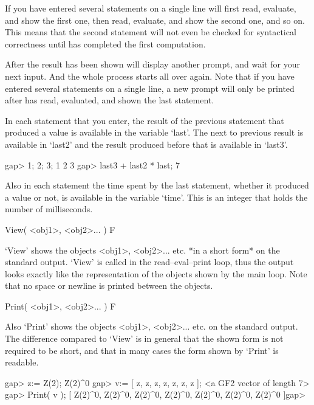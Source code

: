 If you have entered several statements on a single line {\GAP} will first
read, evaluate, and show the first one, then read, evaluate, and show
the second one, and so on. This means that the second statement will not
even be checked for syntactical correctness until {\GAP} has completed
the first computation.

After the result has been shown {\GAP} will display another prompt, and
wait for your next input.
And the whole process starts all over again.
Note that if you have entered several statements on a single line,
a new prompt will only be printed after {\GAP} has read, evaluated,
and shown the last statement.

In each statement that you enter, the result of the previous statement
that produced a value is available in the variable `last'. The next to
previous result is available in `last2' and the result produced before
that is available in `last3'.

\beginexample
gap> 1; 2; 3;
1
2
3
gap> last3 + last2 * last;
7 
\endexample

Also in each statement the time spent by the last statement, whether it
produced a value or not, is available in the variable `time'. This is an
integer that holds the number of milliseconds.


\>View( <obj1>, <obj2>... ) F

`View' shows the objects <obj1>, <obj2>... etc. *in a short form*
on the standard output.
`View' is called in the read--eval--print loop,
thus the output looks exactly like the representation of the
objects shown by the main loop.
Note that no space or newline is printed between the objects.

\>Print( <obj1>, <obj2>... ) F

Also `Print' shows the objects <obj1>, <obj2>... etc.
on the standard output.
The difference compared to `View' is in general that the shown form
is not required to be short,
and that in many cases the form shown by `Print' is {\GAP} readable.


\beginexample
gap> z:= Z(2);
Z(2)^0
gap> v:= [ z, z, z, z, z, z, z ];
<a GF2 vector of length 7>
gap> Print( v );
[ Z(2)^0, Z(2)^0, Z(2)^0, Z(2)^0, Z(2)^0, Z(2)^0, Z(2)^0 ]gap>
\endexample

